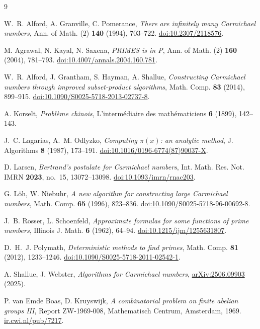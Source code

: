 \documentclass[11pt]{amsart}
\begin{document}
\begin{thebibliography}{9}

 W.~R. Alford, A. Granville, C. Pomerance,
\emph{There are infinitely many Carmichael numbers},
Ann. of Math. (2) \textbf{140} (1994), 703--722.
\href{https://doi.org/10.2307/2118576}{doi:10.2307/2118576}.

 M. Agrawal, N. Kayal, N. Saxena,
\emph{PRIMES is in P},
Ann. of Math. (2) \textbf{160} (2004), 781--793.
\href{https://doi.org/10.4007/annals.2004.160.781}{doi:10.4007/annals.2004.160.781}.

 W.~R. Alford, J. Grantham, S. Hayman, A. Shallue,
\emph{Constructing Carmichael numbers through improved subset-product
algorithms}, Math. Comp. \textbf{83} (2014), 899--915.
\href{https://doi.org/10.1090/S0025-5718-2013-02737-8}{doi:10.1090/S0025-5718-2013-02737-8}.

 A. Korselt,
\emph{Probl\`eme chinois},
L'interm\'ediaire des math\'ematiciens \textbf{6} (1899), 142--143.

 J.~C. Lagarias, A.~M. Odlyzko,
\emph{Computing $\pi(x)$: an analytic method},
J. Algorithms \textbf{8} (1987), 173--191.
\href{https://doi.org/10.1016/0196-6774(87)90037-X}{doi:10.1016/0196-6774(87)90037-X}.

 D. Larsen,
\emph{Bertrand's postulate for Carmichael numbers},
Int. Math. Res. Not. IMRN \textbf{2023}, no.~15, 13072--13098.
\href{https://doi.org/10.1093/imrn/rnac203}{doi:10.1093/imrn/rnac203}.

 G. L\"oh, W. Niebuhr,
\emph{A new algorithm for constructing large Carmichael numbers},
Math. Comp. \textbf{65} (1996), 823--836.
\href{https://doi.org/10.1090/S0025-5718-96-00692-8}{doi:10.1090/S0025-5718-96-00692-8}.

 J.~B. Rosser, L. Schoenfeld,
\emph{Approximate formulas for some functions of prime numbers},
Illinois J. Math. \textbf{6} (1962), 64--94.
\href{https://doi.org/10.1215/ijm/1255631807}{doi:10.1215/ijm/1255631807}.

 D.~H.~J. Polymath,
\emph{Deterministic methods to find primes},
Math. Comp. \textbf{81} (2012), 1233--1246.
\href{https://doi.org/10.1090/S0025-5718-2011-02542-1}{doi:10.1090/S0025-5718-2011-02542-1}.

 A. Shallue, J. Webster,
\emph{Algorithms for Carmichael numbers},
\href{https://arxiv.org/abs/2506.09903}{arXiv:2506.09903} (2025).

 P. van Emde Boas, D. Kruyswijk,
\emph{A combinatorial problem on finite abelian groups III},
Report ZW-1969-008, Mathematisch Centrum, Amsterdam, 1969.
\href{https://ir.cwi.nl/pub/7217}{ir.cwi.nl/pub/7217}.

\end{thebibliography}
\end{document}
